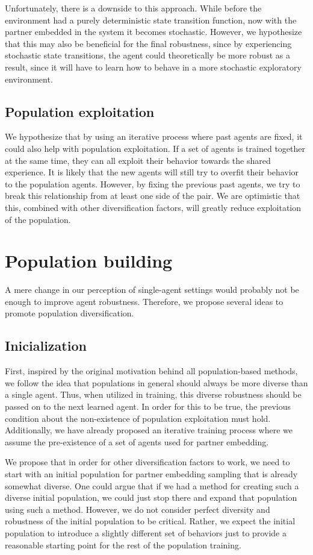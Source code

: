Unfortunately, there is a downside to this approach.
While before the environment had a purely deterministic state transition function, now with the partner embedded in the system it becomes stochastic.
However, we hypothesize that this may also be beneficial for the final robustness, since by experiencing stochastic state transitions, the agent could theoretically be more robust as a result, since it will have to learn how to behave in a more stochastic exploratory environment.

\subsection{Population exploitation}
We hypothesize that by using an iterative process where past agents are fixed, it could also help with population exploitation.
If a set of agents is trained together at the same time, they can all exploit their behavior towards the shared experience.
It is likely that the new agents will still try to overfit their behavior to the population agents.
However, by fixing the previous past agents, we try to break this relationship from at least one side of the pair.
We are optimistic that this, combined with other diversification factors, will greatly reduce exploitation of the population.


\section{Population building}
A mere change in our perception of single-agent settings would probably not be enough to improve agent robustness.
Therefore, we propose several ideas to promote population diversification.
\subsection{Inicialization}
First, inspired by the original motivation behind all population-based methods, we follow the idea that populations in general should always be more diverse than a single agent.
Thus, when utilized in training, this diverse robustness should be passed on to the next learned agent.
In order for this to be true, the previous condition about the non-existence of population exploitation must hold.
Additionally, we have already proposed an iterative training process where we assume the pre-existence of a set of agents used for partner embedding.

We propose that in order for other diversification factors to work, we need to start with an initial population for partner embedding sampling that is already somewhat diverse.
One could argue that if we had a method for creating such a diverse initial population, we could just stop there and expand that population using such a method.
However, we do not consider perfect diversity and robustness of the initial population to be critical. 
Rather, we expect the initial population to introduce a slightly different set of behaviors just to provide a reasonable starting point for the rest of the population training.

